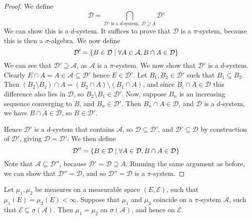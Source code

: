 \begin{proof}
	We define
	\[ \mathcal D = \bigcap_{\mathcal D' \text{ is a } d \text{-system};\; \mathcal D \supseteq A} \mathcal D' \]
	We can show this is a \( d \)-system.
	It suffices to prove that \( \mathcal D \) is a \( \pi \)-system, because this is then a \( \sigma \)-algebra.
	We now define
	\[ \mathcal D' = \qty{B \in \mathcal D \mid \forall A \in \mathcal A, B \cap A \in \mathcal D} \]
	We can see that \( \mathcal D' \supseteq \mathcal A \), as \( \mathcal A \) is a \( \pi \)-system.
	We now show that \( \mathcal D' \) is a \( d \)-system.
	Clearly \( E \cap A = A \in \mathcal A \subseteq \mathcal D' \) hence \( E \in \mathcal D' \).
	Let \( B_1, B_2 \in \mathcal D' \) such that \( B_1 \subseteq B_2 \).
	Then \( (B_2 \setminus B_1) \cap A = (B_2 \cap A) \setminus (B_1 \cap A) \), and since \( B_i \cap A \in \mathcal D \) this difference also lies in \( \mathcal D \), so \( B_2 \setminus B_1 \in \mathcal D' \).
	Now, suppose \( B_n \) is an increasing sequence converging to \( B \), and \( B_n \in \mathcal D' \).
	Then \( B_n \cap A \in \mathcal D \), and \( \mathcal D \) is a \( d \)-system, we have \( B \cap A \in \mathcal D \), so \( B \in \mathcal D' \).

	Hence \( \mathcal D' \) is a \( d \)-system that contains \( \mathcal A \), so \( \mathcal D \subseteq \mathcal D' \), and \( \mathcal D' \subseteq \mathcal D \) by construction of \( \mathcal D' \), giving \( \mathcal D = \mathcal D' \).
	We then define
	\[ \mathcal D'' = \qty{B \in \mathcal D \mid \forall A \in \mathcal D, B \cap A \in \mathcal D} \]
	Note that \( \mathcal A \subseteq \mathcal D'' \), because \( \mathcal D' = \mathcal D \supseteq A \).
	Running the same argument as before, we can show that \( \mathcal D'' = \mathcal D \), and so \( \mathcal D'' = \mathcal D \) is a \( \pi \)-system.
\end{proof}
\begin{theorem}
	Let \( \mu_1, \mu_2 \) be measures on a measurable space \( (E, \mathcal E) \), such that \( \mu_1(E) = \mu_2(E) < \infty \).
	Suppose that \( \mu_1 \) and \( \mu_2 \) coincide on a \( \pi \)-system \( \mathcal A \), such that \( \mathcal E \subseteq \sigma(\mathcal A) \).
	Then \( \mu_1 = \mu_2 \) on \( \sigma(\mathcal A) \), and hence on \( \mathcal E \).
\end{theorem}
